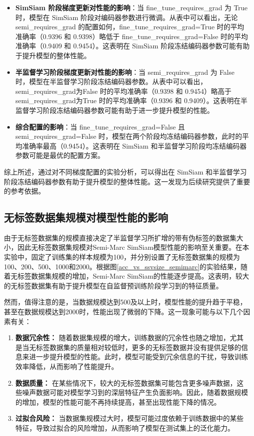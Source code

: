 \documentclass[master]{thesis-uestc}
\begin{document}
\begin{itemize}
    \item \textbf{SimSiam 阶段梯度更新对性能的影响}：当 fine\_tune\_requires\_grad 为 True 时，模型在 SimSiam 阶段对编码器参数进行微调。从表中可以看出，无论 semi\_requires\_grad 的配置如何，fine\_tune\_requires\_grad=True 时的平均准确率（0.9396 和 0.9398）略低于 fine\_tune\_requires\_grad=False 时的平均准确率（0.9409 和 0.9454）。这表明在 SimSiam 阶段冻结编码器参数可能有助于提升模型的整体性能。

    \item \textbf{半监督学习阶段梯度更新对性能的影响}：当 semi\_requires\_grad 为 False 时，模型在半监督学习阶段冻结编码器参数。从表中可以看出，semi\_requires\_grad为False 时的平均准确率（0.9398 和 0.9454）略高于 semi\_requires\_grad为True 时的平均准确率（0.9396 和 0.9409）。这表明在半监督学习阶段冻结编码器参数可能有助于进一步提升模型的性能。

    \item \textbf{综合配置的影响}：当 fine\_tune\_requires\_grad=False 且 semi\_requires\_grad=False 时，模型在两个阶段均冻结编码器参数，此时的平均准确率最高（0.9454）。这表明在 SimSiam 和半监督学习阶段均冻结编码器参数可能是最优的配置方案。
\end{itemize}

综上所述，通过对不同梯度配置的实验分析，可以得出在 SimSiam 和半监督学习阶段冻结编码器参数有助于提升模型的整体性能。这一发现为后续研究提供了重要的参考依据。

\subsection{无标签数据集规模对模型性能的影响}
由于无标签数据集的规模直接决定了半监督学习所扩增的带有伪标签的数据集大小，因此无标签数据集规模对Semi-Marc SimSiam模型性能的影响至关重要。在本实验中，固定了训练集的样本规模为100，并分别设置了无标签数据集的规模为100、200、500、1000和2000。根据图\ref{acc_vs_ssvsize_semimarc}的实验结果，随着无标签数据集规模的增加，Semi-Marc SimSiam的性能逐步提高。这表明，较大的无标签数据集有助于提升模型在自监督预训练阶段学习到的特征质量。

然而，值得注意的是，当数据规模达到500及以上时，模型性能的提升趋于平稳，甚至在数据规模达到2000时，性能出现了微弱的下降。这一现象可能与以下几个因素有关：

\begin{enumerate}[label={(\arabic*)}]
    \item \textbf{数据冗余性：} 随着数据集规模的增大，训练数据的冗余性也随之增加，尤其是当无标签数据集的质量相对较低时，更多的无标签数据并没有提供足够的信息来进一步提升模型的性能。此时，模型可能受到冗余信息的干扰，导致训练效率降低，从而影响了性能提升。
    \item \textbf{数据质量：} 在某些情况下，较大的无标签数据集可能包含更多噪声数据，这些噪声数据可能对模型学习到的深层特征产生负面影响。因此，随着数据规模的增加，模型的性能可能不再持续提高，甚至出现性能下降的情况。
    \item \textbf{过拟合风险：} 当数据集规模过大时，模型可能过度依赖于训练数据中的某些特征，导致过拟合的风险增加，从而影响了模型在测试集上的泛化能力。
\end{enumerate}
\end{document}
